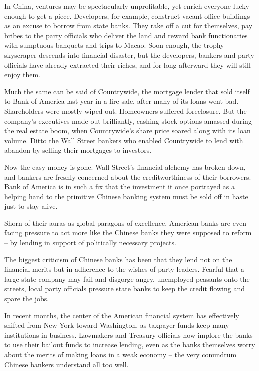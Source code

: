 \documentclass[12pt,a4paper,onecolumn]{article}
\begin{document}
In China, ventures may be spectacularly unprofitable, yet enrich everyone lucky enough to get a
piece. Developers, for example, construct vacant office buildings as an excuse to borrow from state
banks. They rake off a cut for themselves, pay bribes to the party officials who deliver the land
and reward bank functionaries with sumptuous banquets and trips to Macao. Soon enough, the trophy
skyscraper descends into financial disaster, but the developers, bankers and party officials have
already extracted their riches, and for long afterward they will still enjoy them.

Much the same can be said of Countrywide, the mortgage lender that sold itself to Bank of America
last year in a fire sale, after many of its loans went bad. Shareholders were mostly wiped out.
Homeowners suffered foreclosure. But the company's executives made out brilliantly, cashing stock
options amassed during the real estate boom, when Countrywide's share price soared along with its
loan volume. Ditto the Wall Street bankers who enabled Countrywide to lend with abandon by selling
their mortgages to investors.

Now the easy money is gone. Wall Street's financial alchemy has broken down, and bankers are freshly
concerned about the creditworthiness of their borrowers. Bank of America is in such a fix that the
investment it once portrayed as a helping hand to the primitive Chinese banking system must be sold
off in haste just to stay alive.

Shorn of their auras as global paragons of excellence, American banks are even facing pressure to
act more like the Chinese banks they were supposed to reform -- by lending in support of politically
necessary projects.

The biggest criticism of Chinese banks has been that they lend not on the financial merits but in
adherence to the wishes of party leaders. Fearful that a large state company may fail and disgorge
angry, unemployed peasants onto the streets, local party officials pressure state banks to keep the
credit flowing and spare the jobs.

In recent months, the center of the American financial system has effectively shifted from New York
toward Washington, as taxpayer funds keep many institutions in business. Lawmakers and Treasury
officials now implore the banks to use their bailout funds to increase lending, even as the banks
themselves worry about the merits of making loans in a weak economy -- the very conundrum Chinese bankers understand all too well.
\end{document}
